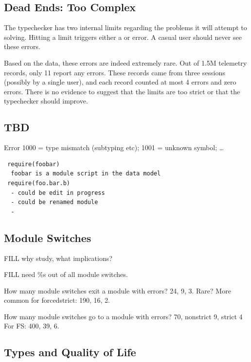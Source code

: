 \documentclass[english,submission,cleveref]{programming}
\begin{document}
\subsection{Dead Ends: Too Complex}

The typechecker has two internal limits regarding the problems it will attempt
to solving.
Hitting a limit triggers either a  or
 error.
A casual user should never see these errors.

Based on the data, these errors are indeed extremely rare.
Out of 1.5M telemetry records, only 11 report any  errors.
These records came from three sessions (possibly by a single user), and each
record counted at most 4  errors and zero
 errors.
There is no evidence to suggest that the limits are too strict or that the
typechecker should improve.


\subsection{TBD}

Error 1000 = type mismatch (subtyping etc);
1001 = unknown symbol;
\ldots



\begin{verbatim}
 require(foobar)
  foobar is a module script in the data model
 require(foo.bar.b)
  - could be edit in progress
  - could be renamed module
  - 
\end{verbatim}


\subsection{Module Switches}

FILL why study, what implications?

FILL need \%s out of all module switches.

How many module switches exit a module with errors?
\mnocheck{} 24, \mnonstrict{} 9, \mstrict{} 3.
Rare?
More common for forcedstrict:
 \mnocheck{} 190, \mnonstrict{} 16, \mstrict{} 2.

How many module switches go to a module with errors?
\mnocheck{} 70, nonstrict 9, strict 4
For FS: \mnocheck{} 400, \mnonstrict{} 39, \mstrict{} 6.


\subsection{Types and Quality of Life}
\end{document}
